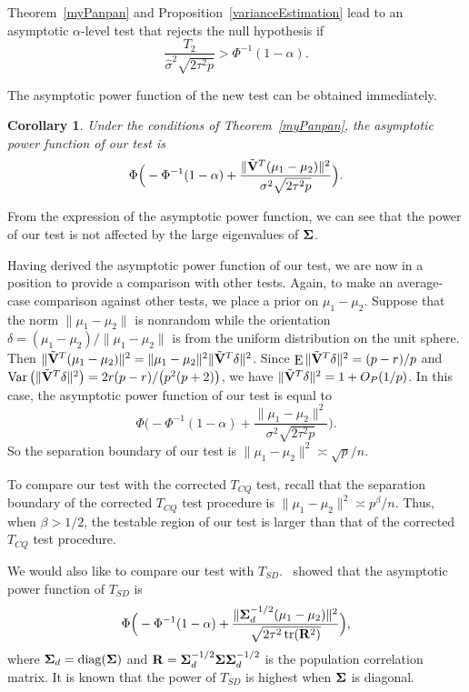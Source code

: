 \documentclass[review]{elsarticle}
\DeclareMathOperator{\mytr}{tr}
\DeclareMathOperator{\mydiag}{diag}
\DeclareMathOperator{\myE}{E}
\DeclareMathOperator{\myVar}{Var}
\theoremstyle{plain}
\newtheorem{corollary}{\quad\quad Corollary}
\theoremstyle{definition}
\theoremstyle{remark}
\begin{document}
 Theorem~\eqref{myPanpan} and Proposition~\ref{varianceEstimation} lead to an asymptotic $\alpha$-level test that rejects the null hypothesis if
    $$
    \frac{T_2}{\hat{\sigma}^2\sqrt{2\tau^2 p}}>\Phi^{-1}(1-\alpha).
    $$


The asymptotic power function of the new test can be obtained immediately.
\begin{corollary}\label{testPowerh}
    Under the conditions of Theorem~\ref{myPanpan}, the asymptotic power function of our test is
    \begin{equation*}
        \Phi\Big(-\Phi^{-1}(1-\alpha)+\frac{\|\tilde{\mathbf{V}}^T(\mu_1-\mu_2)\|^2}{\sigma^2\sqrt{2\tau^2p}}\Big).
    \end{equation*}
\end{corollary}
From the expression of the asymptotic power function, we can see that the power of our test is not affected by the large eigenvalues of $\boldsymbol{\Sigma}$.

Having derived the asymptotic power function of our test, we are now in a position to provide a comparison with other tests.
Again, to make an average-case comparison against other tests, we place a prior on $\mu_1-\mu_2$.
Suppose that the norm $\|\mu_1-\mu_2\|$ is nonrandom while the orientation $\delta=(\mu_1-\mu_2)/\|\mu_1-\mu_2\|$ is from the uniform distribution on the unit sphere.
Then $\|\tilde{\mathbf{V}}^T(\mu_1-\mu_2)\|^2=\|\mu_1-\mu_2\|^2 \|\tilde{\mathbf{V}}^T\delta\|^2$.
Since $\myE \|\tilde{\BV}^T\delta\|^2=(p-r)/p$ and $\myVar \big(\|\tilde{\BV}^T\delta\|^2\big) = 2r(p-r)/\big(p^2(p+2)\big)$, we have $\|\tilde{\mathbf{V}}^T\delta\|^2=1+O_P(1/p)$.
In this case, the asymptotic power function of our test is equal to
    \begin{equation*}
        \Phi\Big(-\Phi^{-1}(1-\alpha)+\frac{\|\mu_1-\mu_2\|^2}{\sigma^2\sqrt{2\tau^2p}}\Big).
    \end{equation*}
So the separation boundary of our test is $\|\mu_1-\mu_2\|^2\asymp \sqrt{p}/n$.

To compare our test with the corrected $T_{CQ}$ test,
recall that the separation boundary of the corrected $T_{CQ}$ test procedure is $\|\mu_1-\mu_2\|^2\asymp p^{\beta}/n$.
 Thus, when $\beta>1/2$, the testable region of our test is larger than that of the corrected $T_{CQ}$ test procedure.

 We would also like to compare our test with $T_{SD}$.~\cite{Srivastava2008A} showed that the asymptotic power function of $T_{SD}$ is
 $$
        \Phi\Big(-\Phi^{-1}(1-\alpha)+\frac{\|\bSigma_d^{-1/2}(\mu_1-\mu_2)\|^2}{\sqrt{2\tau^2\mytr(\BR^2)}}\Big),
 $$
 where $\bSigma_d=\mydiag(\bSigma)$ and $\mathbf{R}=\boldsymbol{\Sigma}_d^{-1/2} \boldsymbol{\Sigma} \boldsymbol{\Sigma}_d^{-1/2}$ is the population correlation matrix.
 It is known that the power of $T_{SD}$ is highest when $\boldsymbol{\Sigma}$ is diagonal.
\end{document}
